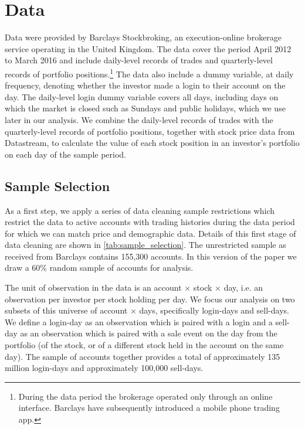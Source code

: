 \section{Data}

Data were provided by Barclays Stockbroking, an execution-online brokerage service operating in the United Kingdom. The data cover the period April 2012 to March 2016 and include daily-level records of trades and quarterly-level records of portfolio positions.\footnote{During the data period the brokerage operated only through an online interface. Barclays have subsequently introduced a mobile phone trading app.} The data also include a dummy variable, at daily frequency, denoting whether the investor made a login to their account on the day. The daily-level login dummy variable covers all days, including days on which the market is closed such as Sundays and public holidays, which we use later in our analysis. We combine the daily-level records of trades with the quarterly-level records of portfolio positions, together with stock price data from Datastream, to calculate the value of each stock position in an investor's portfolio on each day of the sample period.

\subsection{Sample Selection}

As a first step, we apply a series of data cleaning sample restrictions which restrict the data to active accounts with trading histories during the data period for which we can match price and demographic data. Details of this first stage of data cleaning are shown in \ref{tab:sample_selection}. The unrestricted sample as received from Barclays contains 155,300 accounts. In this version of the paper we draw a 60\% random sample of accounts for analysis. 

The unit of observation in the data is an account $\times$ stock $\times$ day, i.e. an observation per investor per stock holding per day. We focus our analysis on two subsets of this universe of account $\times$ days, specifically login-days and sell-days. We define a login-day as an observation which is paired with a login and a sell-day as an observation which is paired with a sale event on the day from the portfolio (of the stock, or of a different stock held in the account on the same day). The sample of accounts together provides a total of approximately 135 million login-days and approximately 100,000 sell-days.

